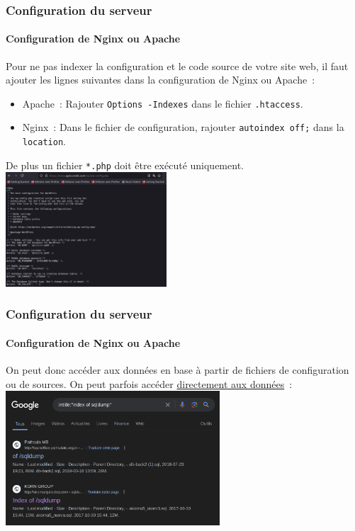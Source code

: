 \documentclass{beamer}
\begin{document}
    \begin{frame}
        \frametitle{Configuration du serveur}
        \framesubtitle{Configuration de Nginx ou Apache}
        \transdissolve
        Pour ne pas indexer la configuration et le code source de votre site web, il faut ajouter les lignes suivantes dans la configuration de Nginx ou Apache~:
        \begin{itemize}
            \item Apache~: Rajouter \lstinline{Options -Indexes} dans le fichier \lstinline{.htaccess}.
            \item Nginx~: Dans le fichier de configuration, rajouter \lstinline{autoindex off;} dans la \lstinline{location}.
        \end{itemize}
        De plus un fichier \lstinline{*.php} doit être exécuté uniquement.
        \bigbreak
        \centering
        \includegraphics[width=6cm]{image/php-to-execute}
    \end{frame}

    \begin{frame}
        \frametitle{Configuration du serveur}
        \framesubtitle{Configuration de Nginx ou Apache}
        \transdissolve
        On peut donc accéder aux données en base à partir de fichiers de configuration ou de sources.
        \bigbreak
        On peut parfois accéder \href{https://www.google.com/search?q=intitle\%3A\%22index+of+sqldump\%22}{directement aux données}~:
        \bigbreak
        \centering
        \includegraphics[width=8cm]{image/dork-sqldump}
    \end{frame}
\end{document}
